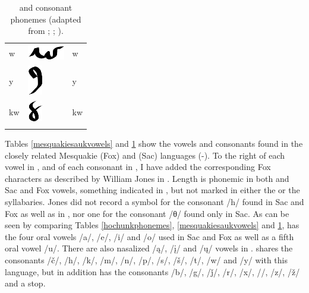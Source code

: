 \documentclass[output=paper]{LSP/langsci}
\begin{document}
\begin{table}
\begin{tabular}{lll}
w & \includegraphics{figures/Danker2w} & w\\
y & \includegraphics{figures/Danker2y} & y\\
kw & \includegraphics{figures/Danker2kw} & kw\\
\lspbottomrule
\end{tabular}
\caption{ and  consonant phonemes (adapted from \citealt{NatLangMeskSauk}; \citealt{Susman1939}; \citealt{Jones1906}).}
\label{mesquakiesaukconsonants}
\end{table}

Tables \ref{mesquakiesaukvowels} and \ref{mesquakiesaukconsonants} show the vowels and consonants found in the closely related Mes\-qua\-kie (Fox) and  (Sac) languages (-). To the right of each vowel in , and of each consonant in , I have added the corresponding Fox  characters as described by William Jones in \citeyear{Jones1906}. Length is phonemic in both  and Sac and Fox vowels, something indicated in , but not marked in either the  or the  syllabaries. Jones did not record a  symbol for the consonant /h/ found in Sac and Fox as well as in , nor one for the consonant /θ/ found only in Sac. As can be seen by comparing Tables \ref{hochunkphonemes}, \ref{mesquakiesaukvowels} and \ref{mesquakiesaukconsonants},  has the four oral vowels /a/, /e/, /i/ and /o/ used in Sac and Fox as well as a fifth  oral vowel /u/. There are also nasalized /\k{a}/, /\k{i}/ and /\k{u}/ vowels in .  shares the consonants /č/, /h/, /k/, /m/, /n/, /p/, /s/, /\v{s}/, /t/, /w/ and /y/ with this  language, but in addition has the consonants /b/, /g/, /\v{j}/, /r/, /x/, //, /z/, /\v{z}/ and a  stop.
				
\end{document}
